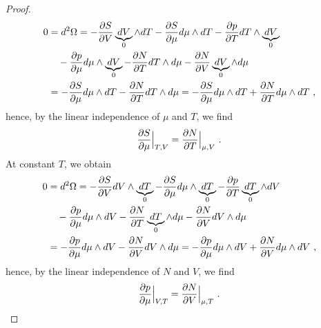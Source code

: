 \begin{proof}
\begin{equation*}
        \begin{aligned}
            0 & = d^2 \Omega = - \frac{\partial S}{\partial V} \underbrace{dV}_0 \wedge dT - \frac{\partial S}{\partial\mu} d\mu \wedge dT - \frac{\partial p}{\partial T} dT \wedge \underbrace{dV}_0 \\ & \quad - \frac{\partial p}{\partial\mu} d\mu \wedge \underbrace{dV}_0 - \frac{\partial N}{\partial T} dT \wedge d\mu - \frac{\partial N}{\partial V} \underbrace{dV}_0 \wedge d\mu \\ & = - \frac{\partial S}{\partial\mu} d\mu \wedge dT - \frac{\partial N}{\partial T} dT \wedge d\mu = - \frac{\partial S}{\partial\mu} d\mu \wedge dT + \frac{\partial N}{\partial T} d\mu \wedge dT ~,
        \end{aligned}
        \end{equation*}
        hence, by the linear independence of $\mu$ and $T$, we find
        \begin{equation*}
            \frac{\partial S}{\partial\mu} \Big \vert_{T,V} = \frac{\partial N}{\partial T} \Big \vert_{\mu,V} ~.
        \end{equation*}
        At constant $T$, we obtain
        \begin{equation*}
        \begin{aligned}
            0 & = d^2 \Omega = - \frac{\partial S}{\partial V} dV \wedge \underbrace{dT}_0 - \frac{\partial S}{\partial\mu} d\mu \wedge \underbrace{dT}_0 - \frac{\partial p}{\partial T} \underbrace{dT}_0 \wedge dV \\ & \quad - \frac{\partial p}{\partial\mu} d\mu \wedge dV - \frac{\partial N}{\partial T} \underbrace{dT}_0 \wedge d\mu - \frac{\partial N}{\partial V} dV \wedge d\mu \\ & = - \frac{\partial p}{\partial\mu} d\mu \wedge dV - \frac{\partial N}{\partial V} dV \wedge d\mu=  - \frac{\partial p}{\partial\mu} d\mu \wedge dV + \frac{\partial N}{\partial V} d\mu \wedge dV ~,
        \end{aligned}
        \end{equation*}
        hence, by the linear independence of $N$ and $V$, we find
        \begin{equation*}
            \frac{\partial p}{\partial\mu} \Big \vert_{V,T} = \frac{\partial N}{\partial V} \Big \vert_{\mu, T} ~.
        \end{equation*}
    \end{proof}

